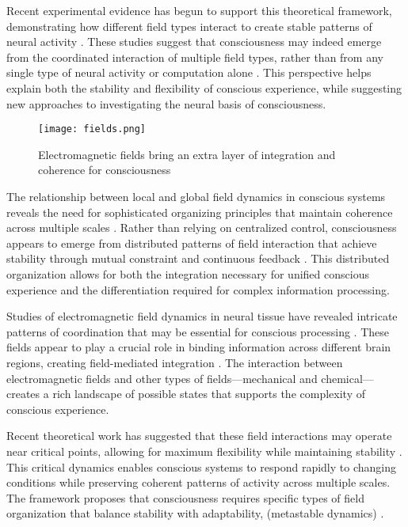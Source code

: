 Recent experimental evidence has begun to support this theoretical framework, demonstrating how different field types interact to create stable patterns of neural activity \cite{DelGiudice1985}. These studies suggest that consciousness may indeed emerge from the coordinated interaction of multiple field types, rather than from any single type of neural activity or computation alone \cite{Atasoy2019}. This perspective helps explain both the stability and flexibility of conscious experience, while suggesting new approaches to investigating the neural basis of consciousness.

\begin{figure}[h]
    \centering
    \texttt{[image: fields.png]}

    \caption{Electromagnetic fields bring an extra layer of integration and coherence for consciousness}
\end{figure}

The relationship between local and global field dynamics in conscious systems reveals the need for sophisticated organizing principles that maintain coherence across multiple scales \cite{Freeman2006}. Rather than relying on centralized control, consciousness appears to emerge from distributed patterns of field interaction that achieve stability through mutual constraint and continuous feedback \cite{Nunez2010}. This distributed organization allows for both the integration necessary for unified conscious experience and the differentiation required for complex information processing.

Studies of electromagnetic field dynamics in neural tissue have revealed intricate patterns of coordination that may be essential for conscious processing \cite{McFadden2002}. These fields appear to play a crucial role in binding information across different brain regions, creating field-mediated integration \cite{Pockett2012}. The interaction between electromagnetic fields and other types of fields—mechanical and chemical—creates a rich landscape of possible states that supports the complexity of conscious experience.

Recent theoretical work has suggested that these field interactions may operate near critical points, allowing for maximum flexibility while maintaining stability \cite{Haken2006}. This critical dynamics enables conscious systems to respond rapidly to changing conditions while preserving coherent patterns of activity across multiple scales. The framework proposes that consciousness requires specific types of field organization that balance stability with adaptability, (metastable dynamics) \cite{Kelso2012}.

